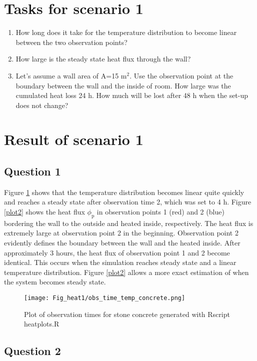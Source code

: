 \section*{Tasks for scenario 1}

\begin{enumerate}
\item How long does it take for the temperature distribution to become linear between the two observation points?
\item How large is the steady state heat flux through the wall?
\item Let's assume a wall area of A=15 m$^2$. Use the observation point at the boundary between the wall and the inside of room. How large was the cumulated heat loss 24 h. How much will be lost after 48 h when the set-up does not change?
\end{enumerate}


\section*{Result of scenario 1}

\subsection*{Question 1}
Figure \ref{plot1} shows that the temperature distribution becomes linear quite quickly and reaches a steady state after observation time 2, which was set to 4 h. Figure \ref{plot2} shows the heat flux $\phi_{\mathrm{p}}$ in observation points 1 (red) and 2 (blue) bordering the wall to the outside and heated inside, respectively.  The heat flux is extremely large at observation point 2 in the beginning. Observation point 2 evidently defines the boundary between the wall and the heated inside. After approximately 3 hours, the heat flux of observation point 1 and 2 become identical. This occurs when the simulation reaches steady state and a linear temperature distribution. Figure \ref{plot2} allows a more exact estimation of when the system becomes steady state. 

\begin{figure}[!h]
\centering
\texttt{[image: Fig\_heat1/obs\_time\_temp\_concrete.png]}
\caption{\label{plot1}Plot of observation times for stone concrete generated with Rscript heatplots.R}
\end{figure}

\subsection*{Question 2}

